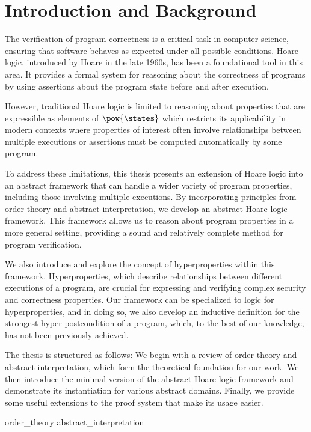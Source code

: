 \chapter{Introduction and Background}

The verification of program correctness is a critical task in computer science, 
ensuring that software behaves as expected under all possible conditions. 
Hoare logic, introduced by Hoare in the late 1960s, has been a foundational tool 
in this area. It provides a formal system for reasoning about the correctness of 
programs by using assertions about the program state before and after execution.

However, traditional Hoare logic is limited to reasoning about properties that
are expressible as elements of $\pow{\states}$ which restricts its applicability 
in modern contexts where properties of interest often involve relationships 
between multiple executions or assertions must be computed automatically by some 
program.

To address these limitations, this thesis presents an extension of Hoare logic 
into an abstract framework that can handle a wider variety of program properties, 
including those involving multiple executions. By incorporating principles from 
order theory and abstract interpretation, we develop an abstract Hoare logic 
framework. This framework allows us to reason about program properties in a more 
general setting, providing a sound and relatively complete method for program 
verification.


We also introduce and explore the concept of hyperproperties within this 
framework. Hyperproperties, which describe relationships between different 
executions of a program, are crucial for expressing and verifying complex 
security and correctness properties. Our framework can be specialized to logic 
for hyperproperties, and in doing so, we also develop an inductive definition 
for the strongest hyper postcondition of a program, which, to the best of our 
knowledge, has not been previously achieved.

The thesis is structured as follows: We begin with a review of order theory and 
abstract interpretation, which form the theoretical foundation for our work. We 
then introduce the minimal version of the abstract Hoare logic framework and 
demonstrate its instantiation for various abstract domains. Finally, we provide 
some useful extensions to the proof system that make its usage easier.

{order_theory}
{abstract_interpretation}
